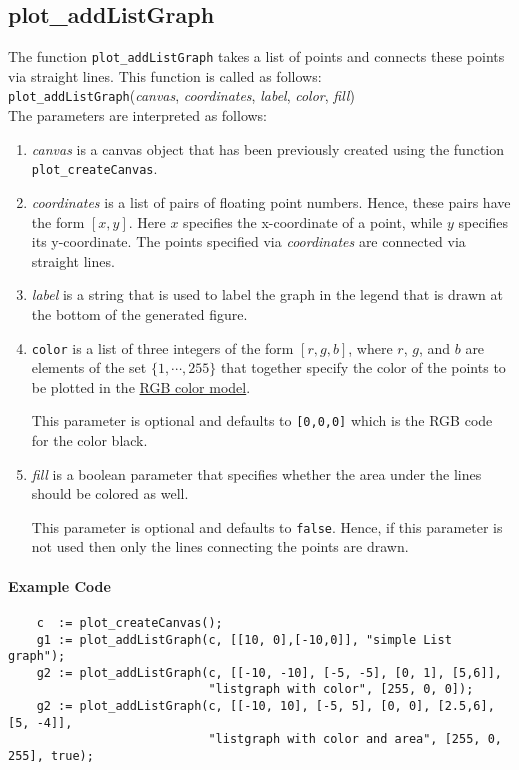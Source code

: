 \subsection{plot\_addListGraph}
The function \texttt{plot\_addListGraph} takes a list of points and connects these points via straight lines.
This function is called as follows:
\\[0.2cm]
\hspace*{1.3cm}
\texttt{plot\_addListGraph}(\textsl{canvas}, \textsl{coordinates}, \textsl{label}, \textsl{color}, \textsl{fill})
\\[0.2cm]
The parameters are interpreted as follows:
\begin{enumerate}
 \item \textsl{canvas} is a canvas object that has been previously created using the function
       \texttt{plot\_createCanvas}.  
\item \textsl{coordinates} is a list of pairs of floating point numbers.  Hence, these pairs have
       the form $[x, y]$.  Here $x$ specifies the x-coordinate of a point, while 
       $y$ specifies its y-coordinate.  The points specified via \textsl{coordinates} are connected
       via straight lines.
\item \textsl{label} is a string that is used to label the graph in the legend that is drawn at
      the bottom of the generated figure.
\item \texttt{color} is a list of three integers of the form $[r,g,b]$, where $r$, $g$, and $b$ are
      elements of the set $\{1, \cdots, 255\}$ that together specify the color of the points
      to be plotted in the \href{https://en.wikipedia.org/wiki/RGB_color_model}{RGB color model}.

      This parameter is optional and defaults to \texttt{[0,0,0]} which is the RGB code for the
      color black.
\item \textsl{fill} is a boolean parameter that specifies whether the area under the lines should be
      colored as well.  

      This parameter is optional and defaults to \texttt{false}.  Hence, if this
      parameter is not used then only the lines connecting the points are drawn.
\end{enumerate}

\paragraph{Example Code}
\begin{verbatim}
    c  := plot_createCanvas();
    g1 := plot_addListGraph(c, [[10, 0],[-10,0]], "simple List graph");
    g2 := plot_addListGraph(c, [[-10, -10], [-5, -5], [0, 1], [5,6]], 
                            "listgraph with color", [255, 0, 0]);
    g2 := plot_addListGraph(c, [[-10, 10], [-5, 5], [0, 0], [2.5,6], [5, -4]], 
                            "listgraph with color and area", [255, 0, 255], true);
\end{verbatim}

